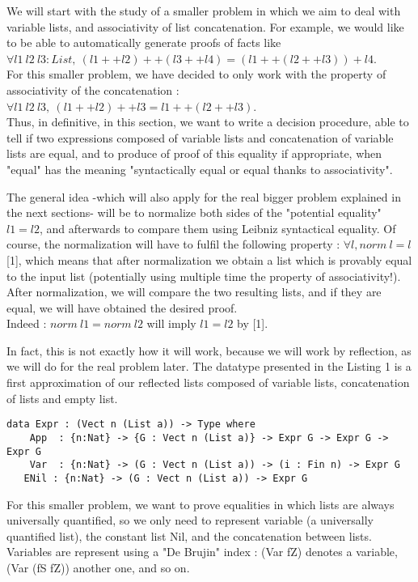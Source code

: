 \documentclass{sigplanconf}
\begin{document}
We will start with the study of a smaller problem in which we aim to deal with variable lists, and associativity of list concatenation.
For example, we would like to be able to automatically generate proofs of facts like $\forall l1\ l2\ l3 : List,\ (l1 ++ l2) ++ (l3 ++ l4) = (l1 ++ (l2 ++ l3)) + l4$. \\
For this smaller problem, we have decided to only work with the property of associativity of the concatenation : $\forall l1\ l2\ l3,\ (l1 ++ l2) ++ l3 = l1 ++ (l2 ++ l3)$. \\
Thus, in definitive, in this section, we want to write a decision procedure, able to tell if two expressions composed of variable lists and concatenation of variable lists are equal, and to produce of proof of this equality if appropriate, when "equal" has the meaning "syntactically equal or equal thanks to associativity".

The general idea -which will also apply for the real bigger problem explained in the next sections- will be to normalize both sides of the "potential equality" $l1=l2$, and afterwards to compare them using Leibniz syntactical equality.
Of course, the normalization will have to fulfil the following property :
$\forall l, norm\ l = l$ [1], which means that after normalization we obtain a list which is provably equal to the input list (potentially using multiple time the property of associativity!). \\
After normalization, we will compare the two resulting lists, and if they are equal, we will have obtained the desired proof.  \\
Indeed :
$norm\ l1 = norm\ l2$ will imply $l1=l2$ by [1].

In fact, this is not exactly how it will work, because we will work by reflection, as we will do for the real problem later. The datatype presented in the Listing 1 is a first approximation of our reflected lists composed of variable lists, concatenation of lists and empty list.


\begin{lstlisting}[caption=Reflected lists, captionpos=b, label=lst1:haskell2]
data Expr : (Vect n (List a)) -> Type where
	App  : {n:Nat} -> {G : Vect n (List a)} -> Expr G -> Expr G -> Expr G 
	Var  : {n:Nat} -> (G : Vect n (List a)) -> (i : Fin n) -> Expr G
   ENil : {n:Nat} -> (G : Vect n (List a)) -> Expr G 
\end{lstlisting}

For this smaller problem, we want to prove equalities in which lists are always universally quantified, so we only need to represent variable (a universally quantified list), the constant list Nil, and the concatenation between lists.
Variables are represent using a "De Brujin" index : (Var fZ) denotes a variable, (Var (fS fZ)) another one, and so on.
\end{document}
